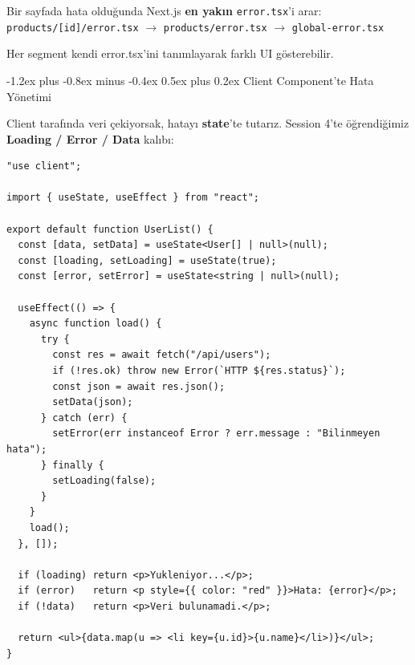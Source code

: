 \documentclass[12pt, a4paper]{article}
\makeatletter
\renewcommand{\subsection}{%
  \@startsection{subsection}{2}{\z@}%
    {-1.2ex plus -0.8ex minus -0.4ex}%
    {0.5ex plus 0.2ex}%
    {\normalfont\large\bfseries\sffamily\color{secondary}}%
}
\makeatother
\begin{document}
\vspace{6pt}

\begin{infobox}
Bir sayfada hata olduğunda Next.js \textbf{en yakın} \texttt{error.tsx}'i arar:
\vspace{4pt}
\texttt{products/[id]/error.tsx} $\rightarrow$
\texttt{products/error.tsx} $\rightarrow$
\texttt{global-error.tsx}

\vspace{4pt}
Her segment kendi error.tsx'ini tanımlayarak farklı UI gösterebilir.
\end{infobox}

\newpage
\subsection{Client Component'te Hata Yönetimi}

Client tarafında veri çekiyorsak, hatayı \textbf{state}'te tutarız.
Session 4'te öğrendiğimiz \textbf{Loading / Error / Data} kalıbı:

\vspace{6pt}

\begin{tcolorbox}[enhanced, colback=codebg, colframe=gray!30,
    colbacktitle=clientcol!85!black, coltitle=white, arc=4pt,
    title={\sffamily\bfseries\small Client'ta Loading + Error + Data}]
\begin{lstlisting}[style=jsxstyle]
"use client";

import { useState, useEffect } from "react";

export default function UserList() {
  const [data, setData] = useState<User[] | null>(null);
  const [loading, setLoading] = useState(true);
  const [error, setError] = useState<string | null>(null);

  useEffect(() => {
    async function load() {
      try {
        const res = await fetch("/api/users");
        if (!res.ok) throw new Error(`HTTP ${res.status}`);
        const json = await res.json();
        setData(json);
      } catch (err) {
        setError(err instanceof Error ? err.message : "Bilinmeyen hata");
      } finally {
        setLoading(false);
      }
    }
    load();
  }, []);

  if (loading) return <p>Yukleniyor...</p>;
  if (error)   return <p style={{ color: "red" }}>Hata: {error}</p>;
  if (!data)   return <p>Veri bulunamadi.</p>;

  return <ul>{data.map(u => <li key={u.id}>{u.name}</li>)}</ul>;
}
\end{lstlisting}
\end{tcolorbox}
\end{document}
